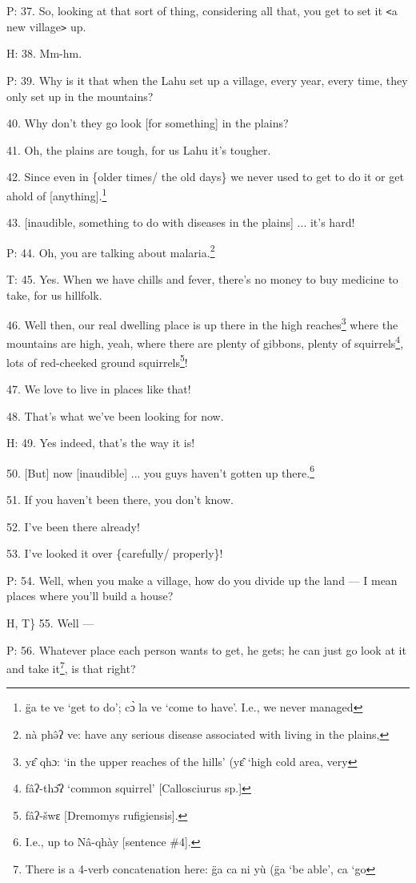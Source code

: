 P: 37. So, looking at that sort of thing, considering all that, you get to set
it \texttt{<}a new village\texttt{>} up.

H: 38. Mm-hm.

P: 39. Why is it that when the Lahu set up a village, every year, every time, they
only set up in the mountains?

40. Why don't they go look [for something] in the plains?

41. Oh, the plains are tough, for us Lahu it's tougher.

42. Since even in \{older times/ the old days\} we never used to get to do it or
get ahold of [anything].\footnote{g̈a te ve `get to do'; cɔ̀ la ve `come to have'. I.e., we never managed}

43. [inaudible, something to do with diseases in the plains] ... it's hard!

P: 44. Oh, you are talking about malaria.\footnote{nà phə̂ʔ ve: have any serious disease associated with living in the plains,}

T: 45. Yes. When we have chills and fever, there's no money to buy medicine to
take, for us hillfolk.

46. Well then, our real dwelling place is up there in the high reaches\footnote{yɛ̂ qhɔ: `in the upper reaches of the hills' (yɛ̂ `high cold area, very} where
the mountains are high, yeah, where there are plenty of gibbons, plenty of squirrels\footnote{fâʔ-thɔ̂ʔ `common squirrel' [Callosciurus sp.]},
lots of red-cheeked ground squirrels\footnote{fâʔ-šwɛ [Dremomys rufigiensis].}!

47. We love to live in places like that!

48. That's what we've been looking for now.

H: 49. Yes indeed, that's the way it is!

50. [But] now [inaudible] ... you guys haven't gotten up there.\footnote{I.e., up to Nâ-qhày [sentence \#4].}

51. If you haven't been there, you don't know.

52. I've been there already!

53. I've looked it over \{carefully/ properly\}!

P: 54. Well, when you make a village, how do you divide up the land --- I mean
places where you'll build a house?

H, T\} 55. Well ---

P: 56. Whatever place each person wants to get, he gets; he can just go look at
it and take it\footnote{There is a 4-verb concatenation here: g̈a ca ni yù (g̈a `be able', ca `go}, is that right?

